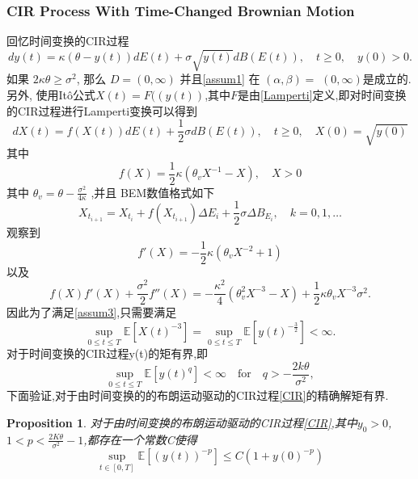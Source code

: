 \documentclass[12pt,final]{article}
\theoremstyle{plain}
\newtheorem{Proposition}[Theorem]{Proposition} %
\theoremstyle{Definition}
\theoremstyle{Remark}
\begin{document}
	\subsubsection{CIR Process With Time-Changed Brownian Motion}
	回忆时间变换的CIR过程
	\begin{equation}\label{CIR}
		dy(t)=\kappa(\theta-y(t))dE(t)+\sigma\sqrt{y(t)}dB(E(t)),\quad t\geq0,\quad y(0)>0.
	\end{equation}
	如果 $2\kappa\theta\geq\sigma^{2}$, 那么 $D=(0,\infty)$ 并且\cref{assum1} 在 $(\alpha,\beta)=$
	$(0,\infty)$是成立的. 
	另外, 使用It\^{o}公式$X(t)=F((y(t))$,其中$F$是由\cref{Lamperti}定义,即对时间变换的CIR过程进行Lamperti变换可以得到
	\begin{equation}
		dX(t)=f(X(t))dE(t)+\frac12\sigma dB(E(t)),\quad t\geq0,\quad X(0)=\sqrt{y(0)}
	\end{equation}
	其中
	\begin{equation}
		f(X)=\dfrac{1}{2}\kappa\left(\theta_vX^{-1}-X\right),\quad X>0
	\end{equation}
	其中 $\theta_v=\theta-\frac{\sigma^2}{4\kappa}$ ,并且 BEM数值格式如下
	\begin{equation}
		X_{t_{i+1}}=X_{t_{i}}+f(X_{t_{i+1}})\Delta E_i+\frac{1}{2}\sigma\Delta B_{E_i},\quad k=0,1,\dots 
	\end{equation}
	观察到
	\begin{equation}
		f'(X)=-\frac{1}{2}\kappa(\theta_vX^{-2}+1)
	\end{equation}
	以及
	\begin{equation}
		f(X)f'(X)+\frac{\sigma^2}{2}f''(X)=-\frac{\kappa^2}{4}(\theta_v^2X^{-3}-X)+\frac{1}{2}\kappa\theta_vX^{-3}\sigma^2.
	\end{equation}
	因此为了满足\cref{assum3},只需要满足
	\begin{equation}
		\sup_{0\leq t\leq T}\mathbb{E}[X(t)^{-3}]=\sup_{0\leq t\leq T}\mathbb{E}[y(t)^{-\frac{3}{2}}] < \infty.
	\end{equation}
	对于时间变换的CIR过程y(t)的矩有界,即
	\begin{equation}
		\sup\limits_{0\leq t\leq T}\mathbb{E}[y(t)^q]<\infty\quad\mathrm{for}\quad q>-\frac{2k\theta}{\sigma^2},
	\end{equation}
	下面验证,对于由时间变换的的布朗运动驱动的CIR过程\cref{CIR}的精确解矩有界.
	\begin{Proposition}
		对于由时间变换的布朗运动驱动的CIR过程\cref{CIR},其中$y_0>0$,$1<p<\frac{2K\theta}{\sigma^2}-1$,都存在一个常数C使得
		\begin{equation*}
			\sup\limits_{t\in[0,T]}\mathbb{E}\left[\left(y(t)\right)^{-p}\right]\leq C(1+y(0)^{-p})
		\end{equation*}
	\end{Proposition}
\end{document}
